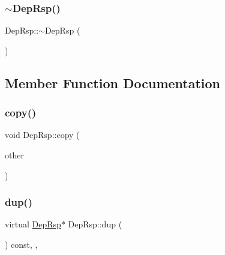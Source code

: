 \mbox{\label{class_dep_rsp_aa4c1e70c5fd15e5a9541b58999df3480}} 
\subsubsection{\texorpdfstring{$\sim$\+Dep\+Rsp()}{~DepRsp()}}
{\footnotesize\ttfamily Dep\+Rsp\+::$\sim$\+Dep\+Rsp (\begin{DoxyParamCaption}{ }\end{DoxyParamCaption})\hspace{0.3cm}{\ttfamily [virtual]}}



\subsection{Member Function Documentation}
\mbox{\label{class_dep_rsp_ad8bf8a80dd4586392e1f5179b7b612f5}} 
\subsubsection{\texorpdfstring{copy()}{copy()}}
{\footnotesize\ttfamily void Dep\+Rsp\+::copy (\begin{DoxyParamCaption}\item[{const \hyperlink{class_dep_rsp}{Dep\+Rsp} \&}]{other }\end{DoxyParamCaption})\hspace{0.3cm}{\ttfamily [private]}}

\mbox{\label{class_dep_rsp_af70e467ce29aac0e865ac06c3a021019}} 
\subsubsection{\texorpdfstring{dup()}{dup()}}
{\footnotesize\ttfamily virtual \hyperlink{class_dep_rsp}{Dep\+Rsp}$\ast$ Dep\+Rsp\+::dup (\begin{DoxyParamCaption}{ }\end{DoxyParamCaption}) const\hspace{0.3cm}{\ttfamily [inline]}, {\ttfamily [override]}, {\ttfamily [virtual]}}

